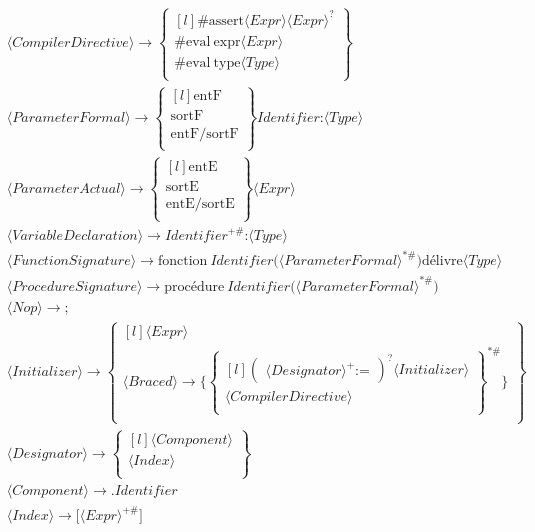\begin{align*}
&⟨CompilerDirective⟩ \to \begin{Bmatrix*}[l]
    \text{\#}\text{assert}⟨Expr⟩⟨Expr⟩^?\\
    \text{\#}\text{eval}\ \text{expr}⟨Expr⟩\\
    \text{\#}\text{eval}\ \text{type}⟨Type⟩\\
\end{Bmatrix*}
\\
&⟨ParameterFormal⟩ \to \begin{Bmatrix*}[l]
    \text{entF} \\
    \text{sortF} \\
    \text{entF/sortF} \\
\end{Bmatrix*}Identifier\text{:}⟨Type⟩
\\
&⟨ParameterActual⟩ \to \begin{Bmatrix*}[l]
    \text{entE} \\
    \text{sortE} \\
    \text{entE/sortE} \\
\end{Bmatrix*}⟨Expr⟩
\\
&⟨VariableDeclaration⟩ \to Identifier^{+\#}\text{:}⟨Type⟩
\\
&⟨FunctionSignature⟩ \to \text{fonction}\ Identifier\text{(}⟨ParameterFormal⟩^{*\#}\text{)} \text{délivre} ⟨Type⟩
\\
&⟨ProcedureSignature⟩ \to \text{procédure}\ Identifier\text{(}⟨ParameterFormal⟩^{*\#}\text{)}
\\
&⟨Nop⟩ \to \text{;}
\\
&⟨Initializer⟩ \to \begin{Bmatrix*}[l]
    ⟨Expr⟩\\
    ⟨Braced⟩ \to \text{\{}
        \begin{Bmatrix*}[l]
            \begin{pmatrix}
                ⟨Designator⟩^+
                \text{:=}
            \end{pmatrix}^?
            ⟨Initializer⟩ \\
            ⟨CompilerDirective⟩ \\
        \end{Bmatrix*}^{*\#}
    \text{\}}\\
\end{Bmatrix*}
\\
&⟨Designator⟩ \to \begin{Bmatrix*}[l]
    ⟨Component⟩ \\
    ⟨Index⟩ \\
\end{Bmatrix*}
\\
&⟨Component⟩ \to \text{.}Identifier
\\
&⟨Index⟩ \to \text{[}⟨Expr⟩^{+\#}\text{]}

\end{align*}
